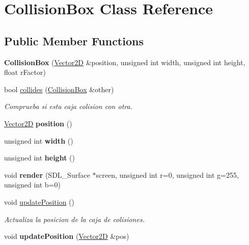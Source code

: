 \hypertarget{class_collision_box}{\section{Collision\-Box Class Reference}
\label{class_collision_box}
}
\subsection*{Public Member Functions}
\begin{DoxyCompactItemize}
\item 
\hypertarget{class_collision_box_a92113ecf916ea574a7f1993659b2e190}{{\bfseries Collision\-Box} (\hyperlink{class_vector2_d}{Vector2\-D} \&position, unsigned int width, unsigned int height, float r\-Factor)}\label{class_collision_box_a92113ecf916ea574a7f1993659b2e190}

\item 
bool \hyperlink{class_collision_box_a3e0464e8fd1958d4365595adcaef7f62}{collides} (\hyperlink{class_collision_box}{Collision\-Box} \&other)
\begin{DoxyCompactList}\small\item\em Comprueba si esta caja colision con otra. \end{DoxyCompactList}\item 
\hypertarget{class_collision_box_a08a13a43fd44a7246a78e9f23c9ed3c8}{\hyperlink{class_vector2_d}{Vector2\-D} {\bfseries position} ()}\label{class_collision_box_a08a13a43fd44a7246a78e9f23c9ed3c8}

\item 
\hypertarget{class_collision_box_ae981febac016cf243c9d10835d5794e4}{unsigned int {\bfseries width} ()}\label{class_collision_box_ae981febac016cf243c9d10835d5794e4}

\item 
\hypertarget{class_collision_box_a14cccdbe5ff8bef90e5d9ac6f1293c9c}{unsigned int {\bfseries height} ()}\label{class_collision_box_a14cccdbe5ff8bef90e5d9ac6f1293c9c}

\item 
\hypertarget{class_collision_box_aeeda736e8c6719a69bf21715c32b0402}{void {\bfseries render} (S\-D\-L\-\_\-\-Surface $\ast$screen, unsigned int r=0, unsigned int g=255, unsigned int b=0)}\label{class_collision_box_aeeda736e8c6719a69bf21715c32b0402}

\item 
\hypertarget{class_collision_box_a1d54ddadc583d2e9ef8e060fed0415e0}{void \hyperlink{class_collision_box_a1d54ddadc583d2e9ef8e060fed0415e0}{update\-Position} ()}\label{class_collision_box_a1d54ddadc583d2e9ef8e060fed0415e0}

\begin{DoxyCompactList}\small\item\em Actualiza la posicion de la caja de colisiones. \end{DoxyCompactList}\item 
\hypertarget{class_collision_box_a49b8304c95a14524cfa181215245cec1}{void {\bfseries update\-Position} (\hyperlink{class_vector2_d}{Vector2\-D} \&pos)}\label{class_collision_box_a49b8304c95a14524cfa181215245cec1}

\end{DoxyCompactItemize}


